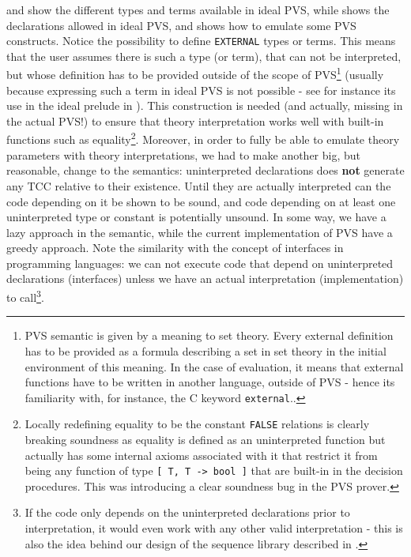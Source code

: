 \documentclass[utf8,a4paper]{article}
\begin{document}
 and  show the different types and
terms available in ideal PVS, while  shows the
declarations allowed in ideal PVS, and  shows how to
emulate some PVS constructs. Notice the possibility to define
\verb!EXTERNAL! types or terms. This means that the user assumes there
is such a type (or term), that can not be interpreted, but whose
definition has to be provided outside of the scope of PVS\footnote{PVS
  semantic is given by a meaning to set theory. Every external
  definition has to be provided as a formula describing a set in set
  theory in the initial environment of this meaning. In the case of
  evaluation, it means that external functions have to be written in
  another language, outside of PVS - hence its familiarity with, for
  instance, the C keyword \verb!external!..} (usually because
expressing such a term in ideal PVS is not possible - see for instance
its use in the ideal prelude in ). This construction
is needed (and actually, missing in the actual PVS!) to ensure that
theory interpretation works well with built-in functions such as
equality\footnote{Locally redefining equality to be the constant
  \verb!FALSE! relations is clearly breaking soundness as equality is
  defined as an uninterpreted function but actually has some internal
  axioms associated with it that restrict it from being any function
  of type \verb![ T, T -> bool ]! that are built-in in the decision
  procedures. This was introducing a clear soundness bug in the PVS
  prover.}. Moreover, in order to fully be able to emulate theory
parameters with theory interpretations, we had to make another big,
but reasonable, change to the semantics: uninterpreted declarations
does \textbf{not} generate any TCC relative to their existence. Until
they are actually interpreted can the code depending on it be shown to
be sound, and code depending on at least one uninterpreted type or
constant is potentially unsound. In some way, we have a lazy approach
in the semantic, while the current implementation of PVS have a greedy
approach. Note the similarity with the concept of interfaces in
programming languages: we can not execute code that depend on
uninterpreted declarations (interfaces) unless we have an actual
interpretation (implementation) to call\footnote{If the code only
  depends on the uninterpreted declarations prior to interpretation,
  it would even work with any other valid interpretation - this is
  also the idea behind our design of the sequence library described in
  .}.
\end{document}
